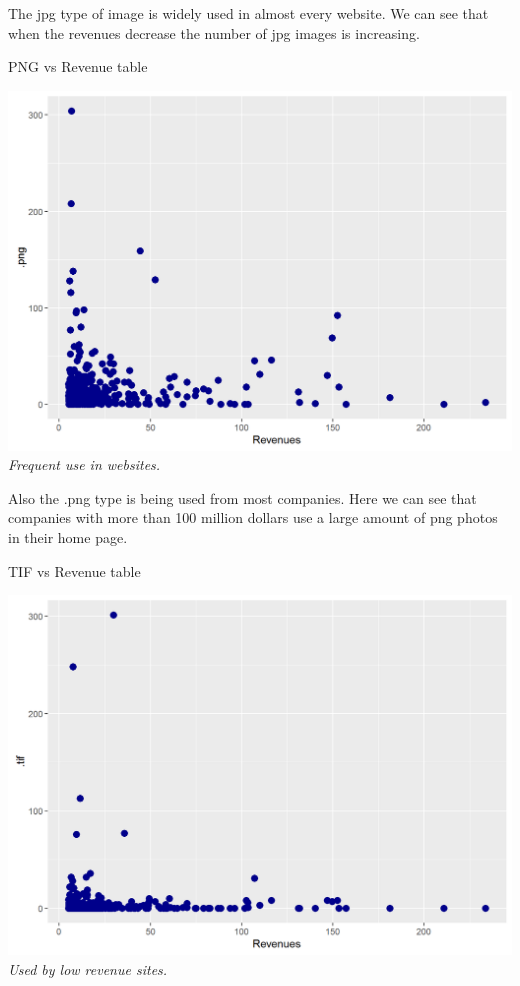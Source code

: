 \documentclass{book}
\begin{document}
The jpg type of image is widely used in almost every website. We can see that when the revenues decrease the number of jpg images is increasing. 
\begin{table}[H]
\centering
\caption{PNG vs Revenue table}
\begin{center}
\includegraphics[scale=0.5]{../R/photos/60_png_rev.png}    \\
\textit{Frequent use in websites.}
\end{center}
\end{table}
Also the .png type is being used from most companies. Here we can see that companies with more than 100 million dollars use a large amount of png photos in their home page.
\begin{table}[H]
\centering
\caption{TIF vs Revenue table}
\begin{center}
\includegraphics[scale=0.5]{../R/photos/61_tif_rev.png}    \\
\textit{Used by low revenue sites.}
\end{center}
\end{table}
\end{document}

